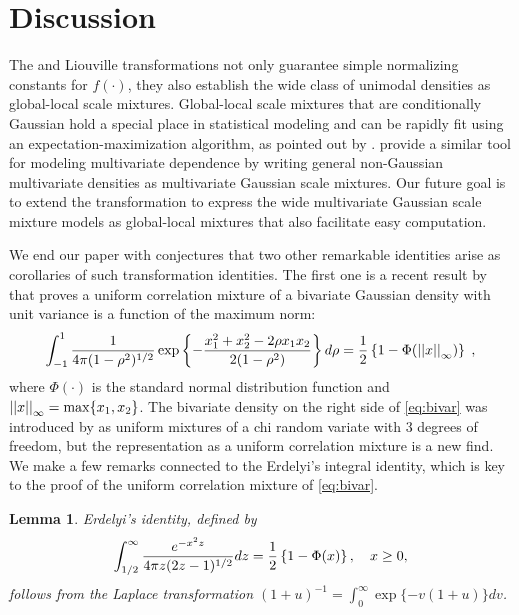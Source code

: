 \documentclass[11pt]{article}
\newtheorem{lemma}[theorem]{Lemma}
\begin{document}
\section{Discussion}
\label{sec:discussion}

The \CS{} and Liouville transformations not only guarantee simple normalizing constants for $f(\cdot)$, they also establish the wide class of unimodal densities as global-local scale mixtures. Global-local scale mixtures that are conditionally Gaussian hold a special place in statistical modeling and can be rapidly fit using an expectation-maximization algorithm, as pointed out by \citet{polson_data_2013}. \citet{palmer_amica:_2011} provide a similar tool for modeling multivariate dependence by writing general non-Gaussian multivariate densities as multivariate Gaussian scale mixtures. Our future goal is to extend the \CS{} transformation to express the wide multivariate Gaussian scale mixture models as global-local mixtures that also facilitate easy computation.

We end our paper with conjectures that two other remarkable identities arise as corollaries of such transformation identities. The first one is a recent result by \cite{zhang2014uniform} that proves a uniform correlation mixture of a bivariate Gaussian density with unit variance is a function of the maximum norm: 
\begin{equation}
  \int_{-1}^{1} \frac{1}{4 \pi (1-\rho^2)^{1/2} } 
  \exp\left\{ - \frac{x_1^2 + x_2^2 - 2 \rho x_1 x_2}{2 (1-\rho^2)} \right\} d\rho = 
  \frac{1}{2} \left\{1- \Phi(\left|\left|x\right|\right|_{\infty})\right\} 
  \;, 
  \label{eq:bivar}
\end{equation}
where $\Phi(\cdot)$ is the standard normal distribution function and $\left|\left|x\right|\right|_{\infty} = \max\{ x_1, x_2\}$. The bivariate density on the
right side of \eqref{eq:bivar} was introduced by \citet{bryson1982constructing} as uniform mixtures of a chi random variate with 3 degrees of freedom, but the representation as a uniform correlation mixture is a new find.  We make a few remarks connected to the Erdelyi's integral identity, which is key to the proof of the uniform correlation mixture of \eqref{eq:bivar}. 
\begin{lemma}
Erdelyi's identity, defined by
\begin{equation}
  \int_{1/2}^{\infty} \frac{e^{-x^2 z}}{4 \pi z 	(2z-1)^{1/2}} dz = \frac{1}{2} \left\{1-\Phi(x)\right\}, \quad x \geq 0, \label{eq:erdelyi}
\end{equation}
follows from the Laplace transformation $(1+u)^{-1} = \int_0^{\infty} \exp\{-v(1+u)\} dv$. 
\end{lemma}
\end{document}

